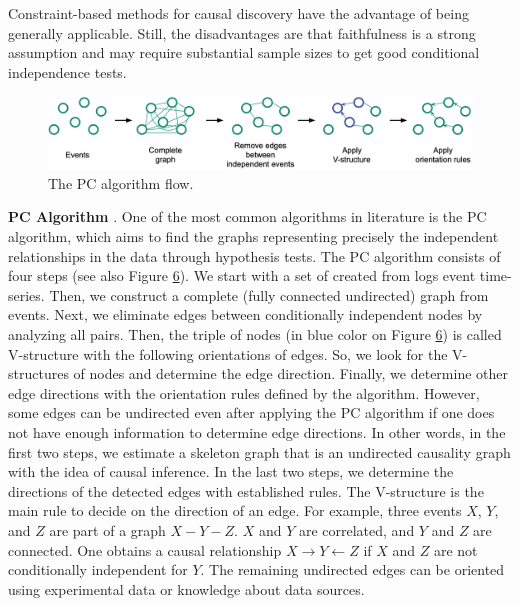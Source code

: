 Constraint-based methods for causal discovery have the advantage of being generally applicable. Still, the disadvantages are that faithfulness is a strong assumption and may require substantial sample sizes to get good conditional independence tests.
\begin{figure}[H]
\centering
    \label{fig:pc}
    \includegraphics[width=\textwidth]{figures/pc.png}
    \caption{The PC algorithm flow.}
\end{figure}
\textbf{PC Algorithm} \cite{spirtes2000causation}. One of the most common algorithms in literature is the PC algorithm, which aims to find the graphs representing precisely the independent relationships in the data through hypothesis tests. The PC algorithm consists of four steps (see also Figure \hyperref[fig:pc]{6}). We start with a set of created from logs event time-series. Then, we construct a complete (fully connected undirected) graph from events. Next, we eliminate edges between conditionally independent nodes by analyzing all pairs. Then, the triple of nodes (in blue color on Figure \hyperref[fig:pc]{6}) is called V-structure with the following orientations of edges. So, we look for the V-structures of nodes and determine the edge direction. Finally, we determine other edge directions with the orientation rules defined by the algorithm. However, some edges can be undirected even after applying the PC algorithm if one does not have enough information to determine edge directions. In other words, in the first two steps, we estimate a skeleton graph that is an undirected causality graph with the idea of causal inference. In the last two steps, we determine the directions of the detected edges with established rules. The V-structure is the main rule to decide on the direction of an edge. For example, three events $X$, $Y$, and $Z$ are part of a graph $X-Y-Z$. $X$ and $Y$ are correlated, and $Y$ and $Z$ are connected. One obtains a causal relationship $X \rightarrow Y \leftarrow Z$ if $X$ and $Z$ are not conditionally independent for $Y$. The remaining undirected edges can be oriented using experimental data or knowledge about data sources. \newline

